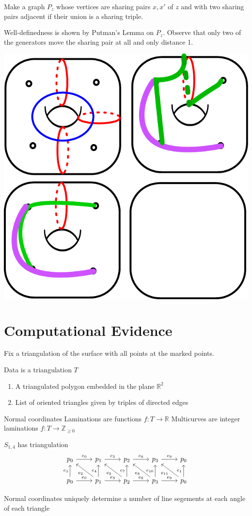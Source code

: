 \documentclass[11pt]{article}
\newcommand{\Z}{\mathbb{Z}}
\newcommand{\R}{\mathbb{R}}
\theoremstyle{remark}
\theoremstyle{definition}
\begin{document}
Make a graph $P_z$ whose vertices are sharing pairs ${x,x'}$
of $z$ and with two sharing pairs adjacent if
their union is a sharing triple.

Well-definedness is shown by Putman's Lemma on $P_z$.
Observe that only two of the generators move the sharing pair
at all and only distance 1.

\includegraphics[width=.5\textwidth]{figures/s14.pdf}


\section{Computational Evidence}

Fix a triangulation of the surface with all points at the marked points.

Data is a triangulation $T$
\begin{enumerate}
  \item A triangulated polygon embedded in the plane $\R^2$
  \item List of oriented triangles given by triples of directed edges
\end{enumerate}

Normal coordinates
Laminations are functions $f: T \to \R$
Multicurves are integer laminations $f: T \to \Z_{\geq 0}$


$S_{1,4}$ has triangulation
 $$
 \begin{tikzcd}
   p_0 \arrow{r}{e_0} & p_1 \arrow{r}{e_3} & p_2 \arrow{r}{e_6} & p_3 \arrow{r}{e_9} & p_0\\
   p_0 \arrow{r}{e_0} \arrow{u}{e_1} & p_1 \arrow{ul}{e_2} \arrow{r}{e_3} \arrow{u}{e_4} & p_2 \arrow{ul}{e_5} \arrow{r}{e_6} \arrow{u}{e_7} & p_3 \arrow{ul}{e_8} \arrow{r}{e_9}  \arrow{u}{e_{10}} & p_0 \arrow{ul}{e_{11}} \arrow{u}{e_1}
 \end{tikzcd}
 $$

Normal coordinates
uniquely
determine a number of line segements at each angle of each triangle
\end{document}
